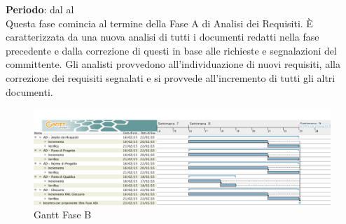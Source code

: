 \textbf{Periodo}: dal  al  \\
Questa fase comincia al termine della Fase A di Analisi dei Requisiti. È caratterizzata da una nuova analisi di tutti i documenti redatti nella fase precedente e dalla correzione di questi in base alle richieste e segnalazioni del committente. Gli analisti provvedono all'individuazione di nuovi requisiti, alla correzione dei requisiti segnalati e si provvede all'incremento di tutti gli altri documenti.
\begin{center}
	\begin{figure}[H]\centering
		\includegraphics[width=\textwidth]{PianoDiProgetto/Pics/FaseB.png}
		\caption{Gantt Fase B}
	\end{figure}
\end{center}
